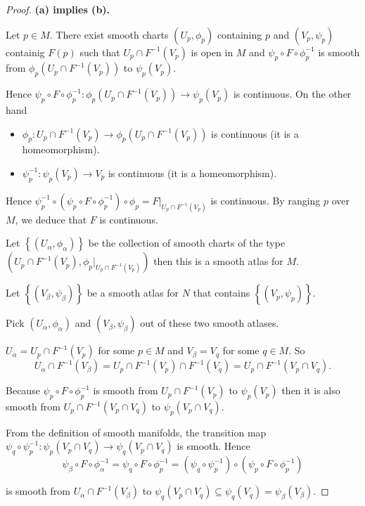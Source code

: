 \begin{proof}
    \textbf{(a) implies (b).}

    Let \( p \in M \). There exist smooth charts \( (U_{p}, \phi_{p}) \) containing \( p \) and \( (V_{p}, \psi_{p}) \) containig \( F(p) \) such that \( U_{p} \cap F^{-1}(V_{p}) \) is open in \( M \) and \( \psi_{p} \circ F \circ \phi_{p}^{-1} \) is smooth from \( \phi_{p}(U_{p} \cap F^{-1}(V_{p})) \) to \( \psi_{p}(V_{p}) \).

    Hence \( \psi_{p} \circ F \circ \phi_{p}^{-1}: \phi_{p}(U_{p} \cap F^{-1}(V_{p})) \to \psi_{p}(V_{p}) \) is continuous. On the other hand
    \begin{itemize}
        \item \( \phi_{p}: U_{p} \cap F^{-1}(V_{p}) \to \phi_{p}(U_{p} \cap F^{-1}(V_{p})) \) is continuous (it is a homeomorphism).
        \item \( \psi_{p}^{-1}: \psi_{p}(V_{p}) \to V_{p} \) is continuous (it is a homeomorphism).
    \end{itemize}

    Hence \( \psi_{p}^{-1} \circ (\psi_{p} \circ F \circ \phi_{p}^{-1}) \circ \phi_{p} = F\vert_{U_{p} \cap F^{-1}(V_{p})} \) is continuous. By ranging \( p \) over \( M \), we deduce that \( F \) is continuous.

    Let \( {\left\{ (U_{\alpha}, \phi_{\alpha}) \right\}} \) be the collection of smooth charts of the type \( (U_{p} \cap F^{-1}(V_{p}), \phi_{p}\vert_{U_{p} \cap F^{-1}(V_{p})}) \) then this is a smooth atlas for \( M \).

    Let \( \left\{ (V_{\beta}, \psi_{\beta}) \right\} \) be a smooth atlas for \( N \) that contains \( \left\{ (V_{p}, \psi_{p}) \right\} \).

    Pick \( (U_{\alpha}, \phi_{\alpha}) \) and \( (V_{\beta}, \psi_{\beta}) \) out of these two smooth atlases.

    \( U_{\alpha} = U_{p} \cap F^{-1}(V_{p}) \) for some \( p \in M \) and \( V_{\beta} = V_{q} \) for some \( q \in M \). So
    \[
        U_{\alpha} \cap F^{-1}(V_{\beta}) = U_{p} \cap F^{-1}(V_{p}) \cap F^{-1}(V_{q}) = U_{p} \cap F^{-1}(V_{p} \cap V_{q}).
    \]

    Because \( \psi_{p} \circ F \circ \phi_{p}^{-1} \) is smooth from \( U_{p} \cap F^{-1}(V_{p}) \) to \( \psi_{p}(V_{p}) \) then it is also smooth from \( U_{p} \cap F^{-1}(V_{p} \cap V_{q}) \) to \( \psi_{p}(V_{p} \cap V_{q}) \).

    From the definition of smooth manifolds, the transition map \( \psi_{q} \circ \psi_{p}^{-1}: \psi_{p}(V_{p} \cap V_{q}) \to \psi_{q}(V_{p} \cap V_{q}) \) is smooth. Hence
    \[
        \psi_{\beta} \circ F \circ \phi_{\alpha}^{-1} = \psi_{q} \circ F \circ \phi_{p}^{-1} = (\psi_{q} \circ \psi_{p}^{-1}) \circ (\psi_{p} \circ F \circ \phi_{p}^{-1})
    \]

    is smooth from \( U_{\alpha} \cap F^{-1}(V_{\beta}) \) to \( \psi_{q}(V_{p} \cap V_{q}) \subseteq \psi_{q}(V_{q}) = \psi_{\beta}(V_{\beta}) \).
\end{proof}

